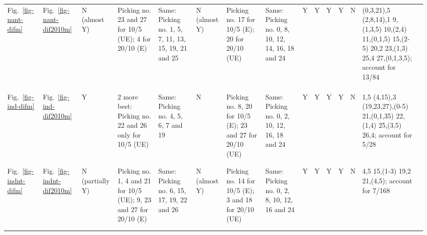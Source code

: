 \begin{table*}
{\begin{tabular}{l|l|l|l|p{2cm}|l|p{2.4cm}|l|lllllll}
Fig.~\ref{fig-nant-difm} & Fig.~\ref{fig-nant-dif2010m} &
  \multirow{2}{*}{\parbox{1cm}{N (almost Y)}} &
  \multirow{2}{*}{\parbox{2.5cm}{Picking no. 23 and 27 for 10/5 (UE); 4 for 20/10 (E)}} &
  \multirow{2}{*}{\parbox{2cm}{Same: Picking no. 1, 5, 7, 11, 13, 15, 19, 21 and 25}} &
  \multirow{2}{*}{\parbox{1cm}{N (almost Y)}} &
  \multirow{2}{*}{\parbox{2cm}{Picking no. 17 for 10/5 (E); 20 for 20/10 (UE)}} &
  \multirow{2}{*}{\parbox{2cm}{Same: Picking no. 0, 8, 10, 12, 14, 16, 18 and 24}} &
  \multicolumn{1}{l|}{Y} & \multicolumn{1}{l|}{Y} & \multicolumn{1}{l|}{Y} &
  \multicolumn{1}{l|}{Y} & \multicolumn{1}{l|}{N} &
  \multicolumn{1}{l|}{\multirow{2}{*}{\parbox{3cm}{(0,3,21),5 (2,8,14),1
  9,(1,3,5) 10,(2,4) 11,(0,1,5) 15,(2-5) 20,2 23,(1,3) 25,4 27,(0,1,3,5);
  account for 13/84}}} &
  \\ \\ \\ \\ \\ \hline
Fig.~\ref{fig-ind-difm} & Fig.~\ref{fig-ind-dif2010m} & Y &
  \multirow{2}{*}{\parbox{2.5cm}{2 more best: Picking no. 22 and 26 only for 10/5 (UE)}} &
  \multirow{2}{*}{\parbox{2cm}{Same: Picking no. 4, 5, 6, 7 and 19}} &
  N & \multirow{2}{*}{\parbox{2.4cm}{Picking no. 8, 20 for 10/5 (E); 23 and 27 for 20/10 (UE)}} &
  \multirow{2}{*}{\parbox{2cm}{Same: Picking no. 0, 2, 10, 12, 16, 18 and 24}} &
  \multicolumn{1}{l|}{Y} & \multicolumn{1}{l|}{Y} & \multicolumn{1}{l|}{Y} &
  \multicolumn{1}{l|}{Y} & \multicolumn{1}{l|}{N} &
  \multicolumn{1}{l|}{\multirow{2}{*}{\parbox{3cm}{1,5 (4,15),3 (19,23,27),(0-5)
  21,(0,1,35) 22,(1,4) 25,(3,5) 26,4; account for 5/28}}} &  \\ \\ \\ \\ \hline
Fig.~\ref{fig-indnt-difm} & Fig.~\ref{fig-indnt-dif2010m} &
  \multirow{2}{*}{\parbox{1cm}{N (partially Y)}} &
  \multirow{2}{*}{\parbox{2.5cm}{Picking no. 1, 4 and 21 for 10/5 (UE);
  9, 23 and 27 for 20/10 (E)}} & \multirow{2}{*}{\parbox{2cm}{Same:
  Picking no. 6, 15, 17, 19, 22 and 26}} & \multirow{2}{*}{\parbox{1cm}{N (almost Y)}} &
  \multirow{2}{*}{\parbox{2.4cm}{Picking no. 14 for 10/5 (E); 3 and 18 for 20/10 (UE)}} &
  \multirow{2}{*}{\parbox{2cm}{Same: Picking no. 0, 2, 8, 10, 12, 16 and 24}} &
  \multicolumn{1}{l|}{Y} & \multicolumn{1}{l|}{Y} & \multicolumn{1}{l|}{Y} &
  \multicolumn{1}{l|}{Y} & \multicolumn{1}{l|}{N} &
  \multicolumn{1}{l|}{\multirow{2}{*}{\parbox{3cm}{4,5 15,(1-3) 19,2
  21,(4,5); account for 7/168}}} &  \\ \\ \\ \\ \hline

\end{tabular}}
\end{table*}
